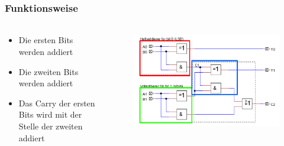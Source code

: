 \begin{frame}
    \frametitle{Funktionsweise}
    \framesubtitle{}
     \begin{columns}[c]
            \begin{block}{}
                \begin{itemize}
                    \item Die ersten Bits werden addiert
                    \item Die zweiten Bits werden addiert
                    \item Das Carry der ersten Bits wird mit der Stelle der
                    zweiten addiert
                \end{itemize}
            \end{block}
            \begin{figure}[H]
            \begin{center}
                    \includegraphics[scale=0.4]{./img/schaltung/Volladdierer_fun_3.png}
            \end{center}
            \end{figure}
     \end{columns}
\end{frame}
